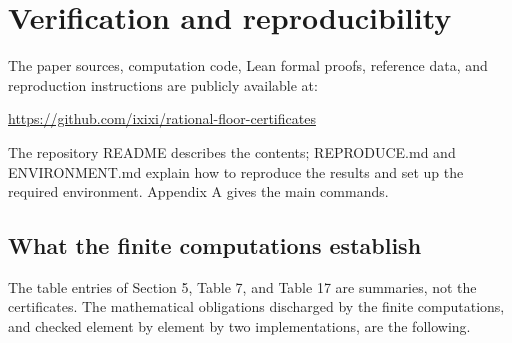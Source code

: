 \documentclass[11pt,reqno]{amsart}
\theoremstyle{definition}
\theoremstyle{remark}
\begin{document}
\section{Verification and reproducibility}\label{sec:9}

The paper sources, computation code, Lean formal proofs, reference data, and reproduction instructions are publicly available at:

\url{https://github.com/ixixi/rational-floor-certificates}

The repository README describes the contents; REPRODUCE.md and ENVIRONMENT.md explain how to reproduce the results and set up the required environment. Appendix A gives the main commands.

\subsection{What the finite computations establish}\label{sec:9.1}

The table entries of Section 5, Table 7, and Table 17 are summaries, not the
certificates. The mathematical obligations discharged by the finite
computations, and checked element by element by two implementations,
are the following.
\end{document}
